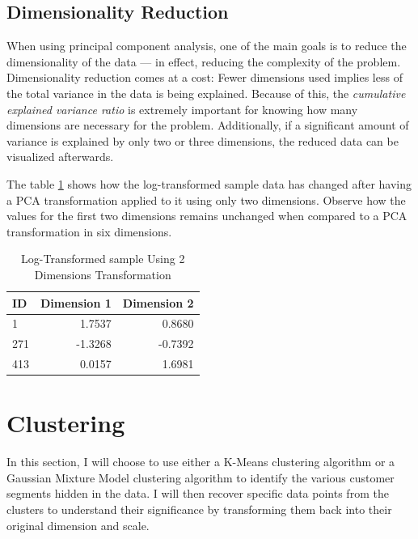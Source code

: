 \documentclass[a4paper]{article}
\begin{document}
\subsection{Dimensionality Reduction}

When using principal component analysis, one of the main goals is to reduce the dimensionality of the data — in effect, reducing the complexity of the problem. Dimensionality reduction comes at a cost: Fewer dimensions used implies less of the total variance in the data is being explained. Because of this, the \textit{cumulative explained variance ratio} is extremely important for knowing how many dimensions are necessary for the problem. Additionally, if a significant amount of variance is explained by only two or three dimensions, the reduced data can be visualized afterwards.

The table \ref{tab:sample_transformed_2} shows how the log-transformed sample data has changed after having a PCA transformation applied to it using only two dimensions. Observe how the values for the first two dimensions remains unchanged when compared to a PCA transformation in six dimensions.

\begin{table}[ht!]
\centering
\begin{tabular}{l|rr}
{ID} &  Dimension 1 &  Dimension 2 \\\hline
1 &       1.7537 &       0.8680 \\
271 &      -1.3268 &      -0.7392 \\
413 &       0.0157 &       1.6981 \\

\end{tabular}
\caption{\label{tab:sample_transformed_2}Log-Transformed sample Using 2 Dimensions Transformation}
\end{table}



\section{Clustering}
\label{sec:clustering}
In this section, I will choose to use either a K-Means clustering algorithm or a Gaussian Mixture Model clustering algorithm to identify the various customer segments hidden in the data. I will then recover specific data points from the clusters to understand their significance by transforming them back into their original dimension and scale.
\end{document}
